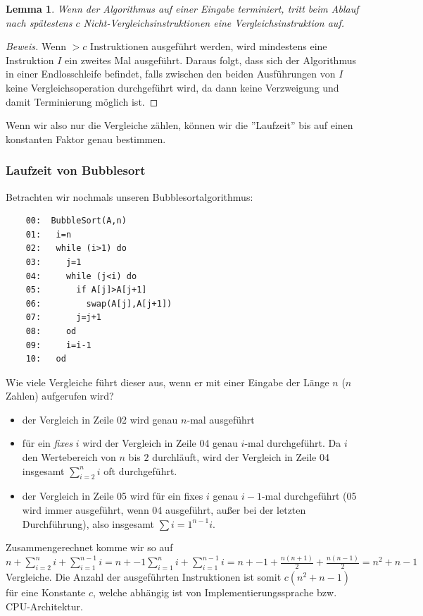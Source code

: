 \documentclass{article}
\newtheorem{lem}[thm]{Lemma}
\begin{document}
\begin{lem}
Wenn der Algorithmus auf einer Eingabe terminiert, tritt beim Ablauf nach spätestens $c$ Nicht-Vergleichsinstruktionen eine Vergleichsinstruktion auf.
\end{lem}
\begin{proof}[Beweis]
Wenn $>c$ Instruktionen ausgeführt werden, wird mindestens eine Instruktion $I$ ein zweites Mal  ausgeführt. Daraus folgt, dass sich der Algorithmus
in einer Endlosschleife befindet, falls zwischen den beiden Ausführungen von $I$ keine Vergleichsoperation durchgeführt wird, da dann keine Verzweigung
und damit Terminierung möglich ist. 
\end{proof}

Wenn wir also nur die Vergleiche zählen, können wir die ''Laufzeit'' bis auf einen konstanten Faktor genau bestimmen.

\subsubsection{Laufzeit von Bubblesort}
Betrachten wir nochmals unseren Bubblesortalgorithmus:
\begin{verbatim}
	00:  BubbleSort(A,n)
	01:   i=n
	02:   while (i>1) do
	03:     j=1
	04:     while (j<i) do
	05:       if A[j]>A[j+1]
	06:         swap(A[j],A[j+1])
	07:       j=j+1
	08:     od
	09:     i=i-1
	10:   od
\end{verbatim}

Wie viele Vergleiche führt dieser aus, wenn er mit einer Eingabe der Länge $n$ ($n$ Zahlen) aufgerufen wird?
\begin{itemize}
\item der Vergleich in Zeile 02 wird genau $n$-mal ausgeführt 
\item für ein \emph{fixes} $i$ wird der Vergleich in Zeile 04 genau $i$-mal durchgeführt. Da $i$ den Wertebereich
	von $n$ bis $2$ durchläuft, wird der Vergleich in Zeile 04 insgesamt $\sum_{i=2}^{n} i$ oft durchgeführt.
\item der Vergleich in Zeile 05 wird für ein fixes $i$ genau $i-1$-mal durchgeführt (05 wird immer ausgeführt, wenn 04
	ausgeführt, außer bei der letzten Durchführung), also insgesamt $\sum {i=1}^{n-1} i$.
\end{itemize}
Zusammengerechnet komme wir so auf $n+\sum_{i=2}^n i + \sum_{i=1}^{n-1}i= n+ -1 \sum_{i=1}^n i + \sum_{i=1}^{n-1}i=n+-1+\frac{n(n+1)}{2}+\frac{n(n-1)}{2}=n^2+n-1$ Vergleiche.
Die Anzahl der ausgeführten Instruktionen ist somit $c(n^2+n-1)$ für eine Konstante $c$, welche abhängig ist von Implementierungssprache bzw. CPU-Architektur.
\end{document}
